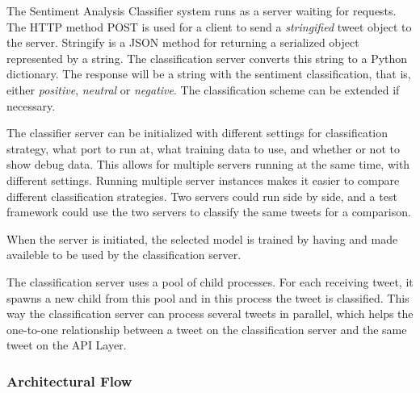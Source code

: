 The Sentiment Analysis Classifier system runs as a server waiting for requests. The HTTP method POST is used for a client to send a \textit{stringified} tweet object to the server. Stringify is a JSON method for returning a serialized object represented by a string. The classification server converts this string to a Python dictionary. The response will be a string with the sentiment classification, that is, either \textit{positive}, \textit{neutral} or \textit{negative}. The classification scheme can be extended if necessary. 

The classifier server can be initialized with different settings for classification strategy, what port to run at, what training data to use, and whether or not to show debug data. This allows for multiple servers running at the same time, with different settings. Running multiple server instances makes it easier to compare different classification strategies. Two servers could run side by side, and a test framework could use the two servers to classify the same tweets for a comparison.

When the server is initiated, the selected model is trained by having and made availeble to be used by the classification server. 

The classification server uses a pool of child processes. For each receiving tweet, it spawns a new child from this pool and in this process the tweet is classified. This way the classification server can process several tweets in parallel, which helps the one-to-one relationship between a tweet on the classification server and the same tweet on the API Layer.

\subsubsection{Architectural Flow}

